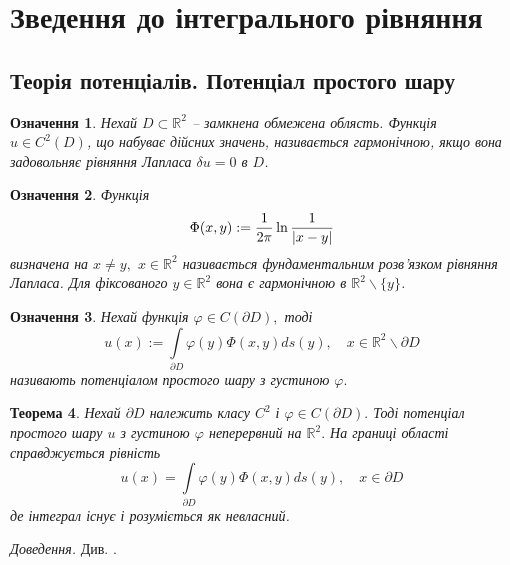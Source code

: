 \documentclass[14pt,a4paper]{extarticle}
\newcounter{e}
\newtheorem{theorem}{Теорема}[section]
\newtheorem{defn}[theorem]{Означення}
\newcommand{\proof}{\textit{Доведення. \space}}
\numberwithin{equation}{section}
\newcommand{\intl}{\int\limits}
\begin{document}
 \newpage
 \thispagestyle{empty}
 \section{Зведення до інтегрального рівняння}
 \subsection{Теорія потенціалів. Потенціал простого шару}

\begin{defn}
	\label{harminic-func}
	Нехай $D \subset \mathbb{R}^2$ -- замкнена обмежена облясть. Функція $u \in C^2(D)$, що набуває дійсних значень, називається гармонічною, якщо вона задовольняє рівняння Лапласа $\delta u = 0$ в $D$.
\end{defn}

 \begin{defn}
	 \label{fundamental-solution}  
	 Функція
 	 \begin{equation}
		 \Phi(x, y) := \frac{1}{2\pi} \ln \frac{1}{\abs{x - y}} 
	 \end{equation}
	 визначена на  $x \neq y,$ $x \in \mathbb{R}^2$ називається фундаментальним розв'язком рівняння Лапласа. Для фіксованого $y \in \mathbb{R}^2$ вона є гармонічною в $\mathbb{R}^2 \backslash \{y\}$.
 \end{defn}
  
 \begin{defn}
	\label{single-layer-potential}
	 Нехай функція $\varphi \in C(\partial D),$ тоді
	 \begin{equation}
		 u(x):=\intl_{\partial D} \varphi(y) \Phi(x, y) d s(y), \quad x \in \mathbb{R}^{2} \backslash \partial D
	 \end{equation}
	 називають потенціалом простого шару з густиною $\varphi .$
 \end{defn}

 \begin{theorem}
 	 \label{potential-on-bound} 
	 Нехай $\partial D$ належить класу $C^{2}$ і $\varphi \in C(\partial D) .$ Тоді потенціал простого шару $u$ з густиною $\varphi$ неперервний на $\mathbb{R}^{2} .$ На границі області справджується рівність
	 \begin{equation}
		 u(x)=\intl_{\partial D} \varphi(y) \Phi(x, y) d s(y), \quad x \in \partial D
	 \end{equation}
	 де інтеграл існує і розуміється як невласний.
 \end{theorem}
 \proof Див. \cite{kress2012linear}.
 
\end{document}
